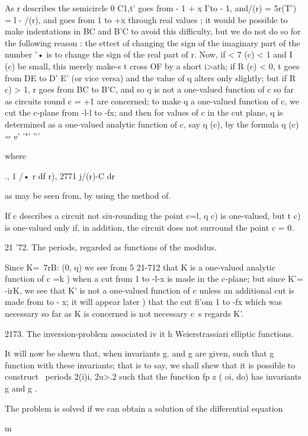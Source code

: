 As r describes the semicircle 0 C1,t' goes from - 1 + x I'to - 1,
and/(r) = 5r(T') = l - /(r), and goes from 1 to +x through real values
; it would be possible to make indentations in BC and B'C to avoid
this difficulty, but we do not do so for the following reason : the
ettect of changing the sign of the imaginary part of the number '• is
to change the sign of the real part of r. Now, if < 7 (c) < 1 and I
(c) be small, this merely make-s t cross OF by a short i>ath; if R
(c) < 0, t goes from DE to D' E' (or vice versa) and the value of q
alters only slightly; but if R c) > 1, r goes from BC to B'C, and so
q is not a one-valued function of c so far as circuits round c = +1
are concerned; to make q a one-valued function of c, we cut the
c-plane from -l-l to -fx; and then for values of c in the cut plane,
q is determined as a one-valued analytic function of c, say q (c), by
the formula q (c) = e' '"' '''

where

., 1 /• r df r), 2771 j/(r)-C dr

as may be seen from, by using the method of.

If c describes a circuit not siu-rounding the point c=l, q c) is
one-valued, but t c) is one-valued only if, in addition, the circuit
does not surround the point c = 0.

21 '72. The periods, regarded as functions of the modidus.

Since K=\ 7rB: (0, q) we see from 5 21-712 that K is a one-valued
analytic function of c =k ) when a cut from 1 to -l-x is made in the
c-plane; but since K'= -irK, we see that K' is not a one-valued
function of c unless an additional cut is made from to - x; it will
appear later ) that the cut fi'om 1 to -fx which was necessary
so far as K is concerned is not necessary c\ s regards K'.

2173. The inversion-problem associated iv it h Weierstrassiari
elliptic functions.

It will now be shewn that, when invariants g. and g are given, such
that g %
function with these invariants; that is to say, we shall shew that it
is possible to construct \ periods 2(i)i, 2u>.2 such that the function
fp z ( oi, do) has invariants g and g .

The problem is solved if we can obtain a solution of the differential
equation

m

